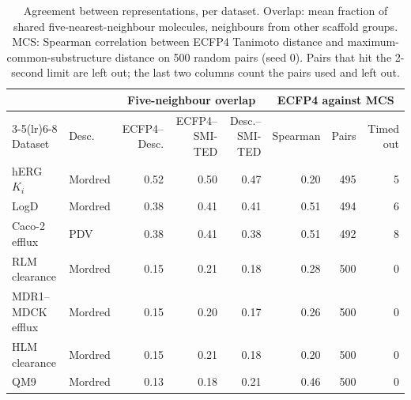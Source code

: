 \begin{table}[t]
\centering
\small
\setlength{\tabcolsep}{4pt}
\caption{Agreement between representations, per dataset. Overlap: mean fraction of shared five-nearest-neighbour molecules, neighbours from other scaffold groups. MCS: Spearman correlation between ECFP4 Tanimoto distance and maximum-common-substructure distance on 500 random pairs (seed 0). Pairs that hit the 2-second limit are left out; the last two columns count the pairs used and left out.}
\label{tab:flaws:neighbour_overlap}
\begin{tabular}{llrrrrrr}
\toprule
 & & \multicolumn{3}{c}{Five-neighbour overlap} & \multicolumn{3}{c}{ECFP4 against MCS} \\
\cmidrule(lr){3-5}\cmidrule(lr){6-8}
Dataset & Desc. & ECFP4--Desc. & ECFP4--SMI-TED & Desc.--SMI-TED & Spearman & Pairs & Timed out \\
\midrule
hERG $K_i$ & Mordred & 0.52 & 0.50 & 0.47 & 0.20 & 495 & 5 \\
LogD & Mordred & 0.38 & 0.41 & 0.41 & 0.51 & 494 & 6 \\
Caco-2 efflux & PDV & 0.38 & 0.41 & 0.38 & 0.51 & 492 & 8 \\
RLM clearance & Mordred & 0.15 & 0.21 & 0.18 & 0.28 & 500 & 0 \\
MDR1--MDCK efflux & Mordred & 0.15 & 0.20 & 0.17 & 0.26 & 500 & 0 \\
HLM clearance & Mordred & 0.15 & 0.21 & 0.18 & 0.20 & 500 & 0 \\
QM9 & Mordred & 0.13 & 0.18 & 0.21 & 0.46 & 500 & 0 \\
\bottomrule
\end{tabular}
\end{table}
